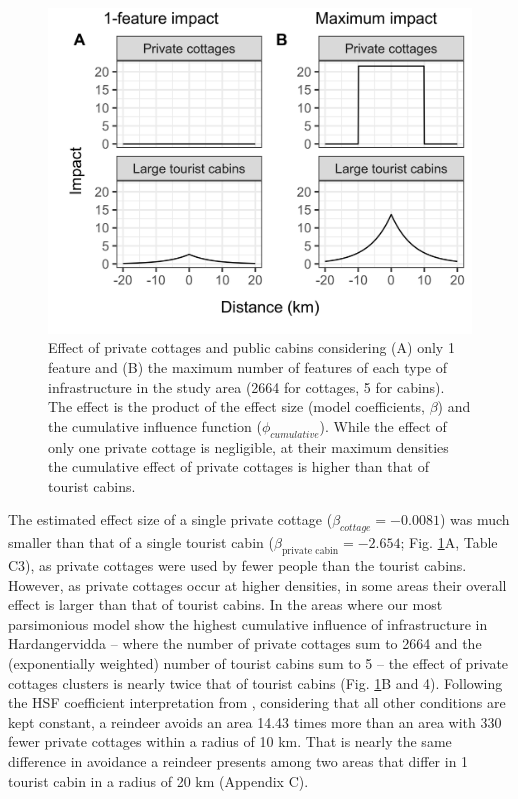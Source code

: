 \documentclass[titlepage]{article}
\begin{document}
\begin{figure}[h]
\centering
\includegraphics[width=1\textwidth,center]{figures/reindeer_zoi_impact_single_multiple_features.png}
\caption{\label{fig:impact_plot} Effect of private cottages and public cabins considering (A) only 1 feature and (B) the maximum number of features of each type of infrastructure in the study area (2664 for cottages, 5 for cabins). The effect is the product of the effect size (model coefficients, $\beta$) and the cumulative influence function ($\phi_{cumulative}$). While the effect of only one private cottage is negligible, at their maximum densities the cumulative effect of private cottages is higher than that of tourist cabins.}
\end{figure}

The estimated effect size of a single private
cottage ($\beta_{cottage} = -0.0081$) was much smaller than that of a single tourist cabin
($\beta_{\text{private cabin}} = -2.654$; Fig. \ref{fig:impact_plot}A, Table C3), as
private cottages were used by fewer people than the tourist cabins. However, as
private cottages occur at higher densities, in some areas their overall effect 
is larger than that of tourist cabins. In the areas where our most parsimonious model show the 
highest cumulative influence of infrastructure in Hardangervidda -- where the number of private cottages sum to 2664 
and the (exponentially weighted) number of tourist cabins sum to 5 -- the effect of 
private cottages clusters is nearly twice that of tourist cabins
 (Fig. \ref{fig:impact_plot}B and 4). Following the HSF coefficient interpretation from \citet{fieberg_how_2021}, considering that all other conditions are kept constant, a reindeer avoids an area 14.43 times more than an area with
330 fewer private cottages within a radius of 10 km. That is nearly the same difference in avoidance a reindeer presents among two areas 
that differ in 1 tourist cabin in a radius of 20 km (Appendix C).
\end{document}
